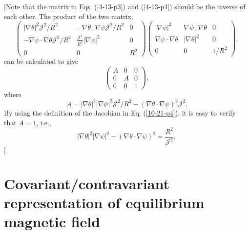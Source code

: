 \documentclass{llncs}
\begin{document}
[Note that the matrix in Eqs. (\ref{4-13-p3}) and (\ref{4-13-p4}) should be
the inverse of each other. The product of the two matrix,
\begin{equation}
  \left(\begin{array}{ccc}
    | \nabla \theta |^2 \mathcal{J}^2 / R^2 & - \nabla \theta \cdot \nabla
    \psi \mathcal{J}^2 / R^2 & 0\\
    - \nabla \psi \cdot \nabla \theta \mathcal{J}^2 / R^2 &
    \frac{\mathcal{J}^2}{R^2} | \nabla \psi |^2 & 0\\
    0 & 0 & R^2
  \end{array}\right) \left(\begin{array}{ccc}
    | \nabla \psi |^2 & \nabla \psi \cdot \nabla \theta & 0\\
    \nabla \psi \cdot \nabla \theta & | \nabla \theta |^2 & 0\\
    0 & 0 & 1 / R^2
  \end{array}\right),
\end{equation}
can be calculated to give
\[ \left(\begin{array}{ccc}
     A & 0 & 0\\
     0 & A & 0\\
     0 & 0 & 1
   \end{array}\right), \]
where
\[ A = | \nabla \theta |^2 | \nabla \psi |^2 \mathcal{J}^2 / R^2 - (\nabla
   \theta \cdot \nabla \psi)^2 \mathcal{J}^2 . \]
By using the definition of the Jacobian in Eq. (\ref{10-21-p4}), it is easy to
verify that $A = 1$, i.e.,
\begin{equation}
  \label{4-13-p7} | \nabla \theta |^2 | \nabla \psi |^2 - (\nabla \theta \cdot
  \nabla \psi)^2 = \frac{R^2}{\mathcal{J}^2},
\end{equation}
]

\section{Covariant/contravariant representation of equilibrium magnetic field}
\end{document}
